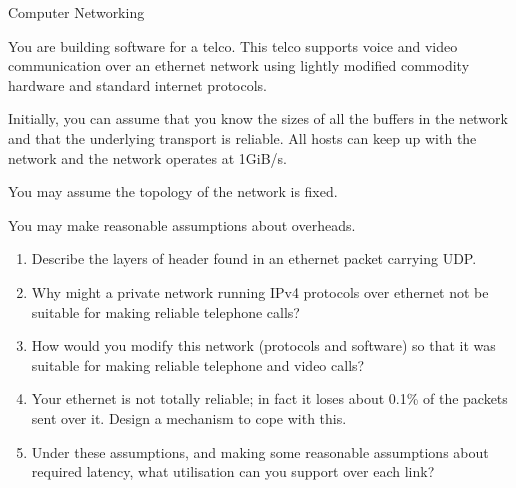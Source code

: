 \documentclass{tripos}  %
\begin{document}
\begin{question}[MockIB,year=2024,paper=1,question=12,author=rrw]{Computer Networking}


You are building software for a telco. This telco supports voice and
video communication over an ethernet network using lightly modified
commodity hardware and standard internet protocols.

Initially, you can assume that you know the sizes of all the buffers
in the network and that the underlying transport is reliable. All
hosts can keep up with the network and the network operates at 1GiB/s.

You may assume the topology of the network is fixed.

You may make reasonable assumptions about overheads.

\begin{enumerate}
\item Describe the layers of header found in an ethernet packet carrying UDP. 
\item Why might a private network running IPv4 protocols over ethernet not be suitable for making reliable telephone calls?
\item How would you modify this network (protocols and software) so that it was suitable for making reliable telephone and video calls? 
\item Your ethernet is not totally reliable; in fact it loses about 0.1\% of the packets sent over it. Design a mechanism to cope with this. 
\item Under these assumptions, and making some reasonable assumptions about required latency, what utilisation can you support over each link? 
  \end{enumerate}


  
  
\end{question}
\end{document}
